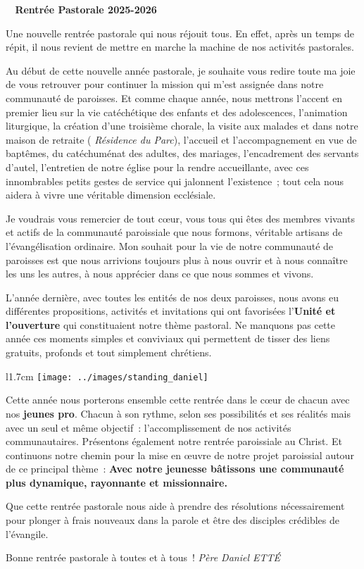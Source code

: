  \begin{center}
 \textbf{
\og 
Rentrée Pastorale 2025-2026
 \fg{}
 }
 \end{center}

Une nouvelle rentrée pastorale qui nous réjouit tous. En effet, après un temps de répit, il nous revient de mettre en marche la machine de nos activités pastorales.

Au début de cette nouvelle année pastorale, je souhaite vous redire toute ma joie de vous retrouver pour continuer la mission qui m’est assignée dans notre communauté de paroisses. Et comme chaque année, nous mettrons l’accent en premier lieu sur la vie catéchétique des enfants et des adolescences, l’animation liturgique, la création d’une troisième chorale, la visite aux malades et dans notre maison de retraite ( \emph{Résidence du Parc}), l’accueil et l’accompagnement en vue de baptêmes,  du catéchuménat des adultes, des mariages, l’encadrement  des servants d’autel, l’entretien de notre église pour la rendre  accueillante, avec ces innombrables petits gestes de service qui jalonnent l’existence ; tout cela nous aidera à vivre une véritable dimension ecclésiale.

Je voudrais vous remercier de tout cœur, vous tous qui êtes des membres vivants et actifs de la communauté paroissiale que nous formons, véritable artisans de l’évangélisation ordinaire. Mon souhait pour la vie de notre communauté de paroisses est que nous arrivions toujours plus à nous ouvrir et à nous connaître les uns les autres, à nous apprécier dans ce que nous sommes et vivons.

L’année dernière, avec toutes les entités de nos deux paroisses, nous avons eu différentes propositions, activités et invitations qui ont favorisées l’\textbf{Unité et l’ouverture} qui constituaient notre thème pastoral. Ne manquons pas cette année ces moments simples et conviviaux qui permettent de tisser des liens gratuits, profonds et tout simplement chrétiens.

\begin{wrapfigure}{l}{1.7cm}
\vspace{-0.4cm}
	\texttt{[image: ../images/standing\_daniel]}
\end{wrapfigure}
Cette année nous porterons ensemble cette rentrée dans le cœur de chacun avec nos \textbf{jeunes pro}. Chacun à son rythme, selon ses possibilités et ses réalités mais avec un seul et même objectif : l’accomplissement de nos activités communautaires. Présentons également notre rentrée paroissiale au Christ. Et continuons notre chemin pour la mise en œuvre de notre projet paroissial autour de ce principal thème : \textbf{\og Avec notre jeunesse bâtissons une communauté plus dynamique, rayonnante et missionnaire\fg{}.}

	Que cette rentrée pastorale nous aide à prendre des résolutions nécessairement pour plonger à frais nouveaux dans la parole et être des disciples crédibles de l’évangile.


\begin{flushright}
Bonne rentrée pastorale à toutes et à tous !
\textit{Père  Daniel  ETTÉ}
\end{flushright}

